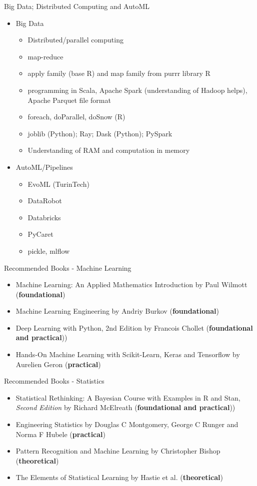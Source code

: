 \documentclass[compress,brown]{beamer}
\begin{document}
\begin{frame}{Big Data; Distributed Computing and AutoML}
\begin{itemize}
	\item Big Data
	\begin{itemize}
		\item Distributed/parallel computing
		\item map-reduce
		\item apply family (base R) and map family from purrr library R
		\item programming in Scala, Apache Spark (understanding of Hadoop helps), Apache Parquet file format
		\item foreach, doParallel, doSnow (R)
		\item joblib (Python); Ray; Dask (Python); PySpark
		\item Understanding of RAM and computation in memory
	\end{itemize}
	\item AutoML/Pipelines
		\begin{itemize}
			\item EvoML (TurinTech)
			\item DataRobot
			\item Databricks
			\item PyCaret
			\item pickle, mlflow
		\end{itemize}
\end{itemize}
\end{frame}

\begin{frame}{Recommended Books - Machine Learning}
\begin{itemize}
	\item Machine Learning: An Applied Mathematics Introduction by Paul Wilmott (\textbf{foundational})
	\item Machine Learning Engineering by Andriy Burkov (\textbf{foundational})
	\item Deep Learning with Python, 2nd Edition by Francois Chollet (\textbf{foundational and practical}))
	\item Hands-On Machine Learning with Scikit-Learn, Keras and Tensorflow by Aurelien Geron (\textbf{practical})
\end{itemize}
\end{frame}

\begin{frame}{Recommended Books - Statistics}
	\begin{itemize}
		\item Statistical Rethinking: A Bayesian Course with Examples in R and Stan, \textit{Second Edition} by Richard McElreath (\textbf{foundational and practical}))
		\item Engineering Statistics by Douglas C Montgomery, George C Runger and Norma F Hubele (\textbf{practical})
		\item Pattern Recognition and Machine Learning by Christopher Bishop (\textbf{theoretical})
		\item The Elements of Statistical Learning by Hastie et al. (\textbf{theoretical})
	\end{itemize}
\end{frame}
\end{document}
